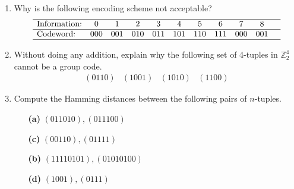 {\small
\begin{enumerate}
 
 
\item
Why is the following encoding scheme not acceptable?
\[
\begin{array}{lcccccccccc}
\hline
\mbox{Information:} & 0 & 1 & 2 & 3 & 4 & 5 & 6 & 7 & 8 &
\\ \hline
\mbox{Codeword:} & 000 & 001 & 010 & 011 & 101 & 110
& 111 & 000 & 001 \\ \hline
\end{array}
\]
 
 
\item
Without doing any addition, explain why the following set of 4-tuples in
${\mathbb Z}_2^4$ cannot be a group code. 
\[
\begin{array}{cccc}
(0110) & (1001) & (1010) & (1100)
\end{array}
\]
 
 
\item    %
Compute the Hamming distances between the following pairs of
$n$-tuples. 
 
\vspace{3pt}        %
 
\hspace{-7pt}
\begin{minipage}[t]{4.6in}
\noindent
\begin{minipage}[t]{2.25in}
\begin{itemize}
 
 \item[{\bf (a)}]
$(011010), (011100)$
 
 \item[{\bf (c)}]
$(00110), (01111)$
 
 
\end{itemize}
\end{minipage} \hfill
\begin{minipage}[t]{2.25in}
\begin{itemize}
 
 \item[{\bf (b)}]
$(11110101), (01010100)$
 
 \item[{\bf (d)}]
$(1001), (0111)$
 
 
\end{itemize}
\end{minipage}
\end{minipage}
 
\vspace{2pt}        %
 

\end{enumerate}}
